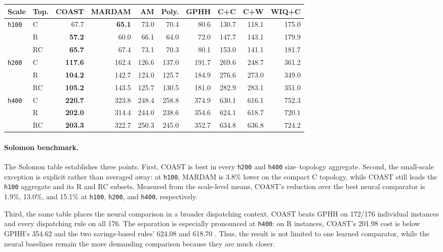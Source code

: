 \documentclass[letterpaper]{article}
\begin{document}
\begin{table}[t]
{%
\begin{tabular}{llrrrrrrrr}
\toprule
Scale & Top. & COAST & MARDAM & AM & Poly. & GPHH & C+C & C+W & WIQ+C \\
\midrule
\texttt{h100} & C  & {67.7} & \textbf{65.1} & 73.0 & 70.4 & 80.6 & 130.7 & 118.1 & 175.0 \\
               & R  & \textbf{57.2} & 60.0 & 66.1 & 64.0 & 72.0 & 147.7 & 143.1 & 179.9 \\
               & RC & \textbf{65.7} & 67.4 & 73.1 & 70.3 & 80.1 & 153.0 & 141.1 & 181.7 \\
\addlinespace
\texttt{h200} & C  & \textbf{117.6} & 162.4 & 126.6 & 137.0 & 191.7 & 269.6 & 248.7 & 361.2 \\
               & R  & \textbf{104.2} & 142.7 & 124.0 & 125.7 & 184.9 & 276.6 & 273.0 & 349.0 \\
               & RC & \textbf{105.2} & 143.5 & 125.7 & 130.5 & 181.0 & 282.9 & 283.1 & 351.0 \\
\addlinespace
\texttt{h400} & C  & \textbf{220.7} & 323.8 & 248.4 & 258.8 & 374.9 & 630.1 & 616.1 & 752.3 \\
               & R  & \textbf{202.0} & 314.4 & 244.0 & 238.6 & 354.6 & 624.1 & 618.7 & 720.1 \\
               & RC & \textbf{203.3} & 322.7 & 250.3 & 245.0 & 352.7 & 634.8 & 636.8 & 724.2 \\
\bottomrule
\end{tabular}
}


\label{tab:rq1_solomon}
\end{table}

\paragraph{Solomon benchmark.} The Solomon table establishes three points. First, COAST is best in every \texttt{h200} and \texttt{h400} size--topology aggregate. Second, the small-scale exception is explicit rather than averaged away: at \texttt{h100}, MARDAM is 3.8\% lower on the compact C topology, while COAST still leads the \texttt{h100} aggregate and its R and RC subsets. Measured from the scale-level means, COAST's reduction over the best neural comparator is 1.9\%, 13.0\%, and 15.1\% at \texttt{h100}, \texttt{h200}, and \texttt{h400}, respectively.

Third, the same table places the neural comparison in a broader dispatching context. COAST beats GPHH on 172/176 individual instances and every dispatching rule on all 176. The separation is especially pronounced at \texttt{h400}: on R instances, COAST's 201.98 cost is below GPHH's 354.62 and the two savings-based rules' 624.08 and 618.70 \cite{clarke1964scheduling}. Thus, the result is not limited to one learned comparator, while the neural baselines remain the more demanding comparison because they are much closer.
\end{document}
